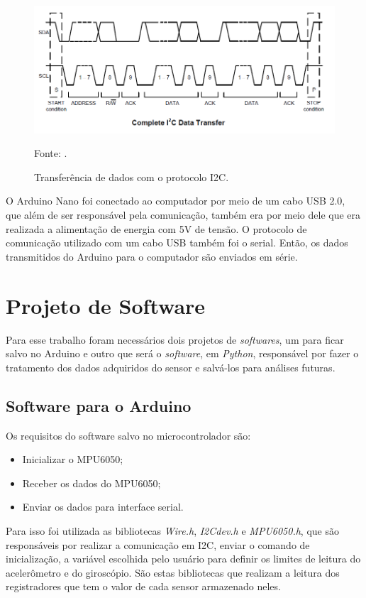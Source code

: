 		\begin{figure}[h]
			\centering
			\includegraphics[keepaspectratio=true,scale=0.5]{figuras/i2c.PNG}
			\caption{Transferência de dados com o protocolo I2C. }
			Fonte: \cite{mpu6050}. 
			\label{i2c}	
		\end{figure}
	
		O Arduino Nano foi conectado ao computador por meio de um cabo USB 2.0, que além de ser responsável pela comunicação, também era por meio dele que era realizada a alimentação de energia com 5V de tensão. O protocolo de comunicação utilizado com um cabo USB também foi o serial. Então, os dados transmitidos do Arduino para o computador são enviados em série. 
		
		
\section {Projeto de Software}
		
		Para esse trabalho foram necessários dois projetos de \textit{softwares}, um para ficar salvo no Arduino e outro que será o \textit{software}, em \textit{Python}, responsável por fazer o tratamento dos dados adquiridos do sensor e salvá-los para análises futuras.
		
		\subsection{Software para o Arduino}
			Os requisitos do software salvo no microcontrolador são:
			\begin{itemize}
				\item Inicializar o MPU6050;
				\item Receber os dados do MPU6050; 
				\item Enviar os dados para interface serial.
			\end{itemize}
		
		Para isso foi utilizada as bibliotecas \textit{Wire.h}, \textit{I2Cdev.h} e \textit{MPU6050.h}, que são responsáveis por realizar a comunicação em I2C, enviar o comando de inicialização, a variável escolhida pelo usuário para definir os limites de leitura do acelerômetro e do giroscópio. São estas bibliotecas que realizam a leitura dos registradores que tem o valor de cada sensor armazenado neles.  
		
